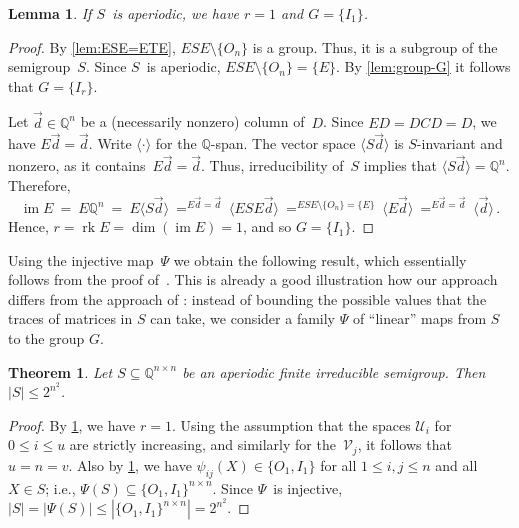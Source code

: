 \documentclass{lmcs}
\newtheorem{theorem}[thm]{Theorem}
\newtheorem{lemma}[thm]{Lemma}
\theoremstyle{definition}
\DeclareMathOperator{\im}{im}
\newcommand{\rk}{\operatorname{rk}}
\newcommand{\Q}{\mathbb{Q}}
\newcommand{\U}{\mathcal{U}}
\newcommand{\V}{\mathcal{V}}
\begin{document}
\begin{lemma} \label{lem:aper-rank}
If $S$~is aperiodic, we have $r=1$ and $G = \{I_1\}$.
\end{lemma}
\begin{proof}
By \cref{lem:ESE=ETE}, $E S E \setminus \{O_n\}$ is a group.
Thus, it is a subgroup of the semigroup~$S$.
Since $S$~is aperiodic, $E S E \setminus \{O_n\} = \{E\}$.
By \cref{lem:group-G} it follows that $G = \{I_r\}$.

Let $\vec{d} \in \Q^n$ be a (necessarily nonzero) column of~$D$.
Since $E D = D C D = D$, we have $E \vec{d} = \vec{d}$.
Write $\langle \cdot \rangle$ for the $\Q$-span.
The vector space $\langle S \vec{d} \rangle$ is $S$-invariant and nonzero, as it contains~$E \vec{d} = \vec{d}$.
Thus, irreducibility of~$S$ implies that $\langle S \vec{d} \rangle = \Q^n$.
Therefore,
\[
 \im E \ = \ E \Q^n \ = \ E \langle S \vec{d} \rangle \ \mathop{=}^{E \vec{d} = \vec{d}} \ \langle E S E \vec{d} \rangle
 \ \mathop{=}^{E S E \setminus \{O_n\} = \{E\}} \ \langle E \vec{d} \rangle \ \mathop{=}^{E \vec{d} = \vec{d}} \ \langle \vec{d} \rangle\,.
\]
Hence, $r = \rk E = \dim (\im E) = 1$, and so $G = \{I_1\}$.
\end{proof}

Using the injective map~$\Psi$ we obtain the following result, which essentially follows from the proof of~\cite[Theorem~5.8]{AlmeidaSteinberg09}. This is already a good illustration how our approach differs from the approach of \cite{Schutzenberger62,Berstel2011,AlmeidaSteinberg09}: instead of bounding the possible values that the traces of matrices in $S$ can take, we consider a family $\Psi$ of ``linear'' maps from $S$ to the group $G$.

\begin{theorem}\label{thm:aper-bound}
Let $S \subseteq \Q^{n \times n}$ be an aperiodic finite irreducible semigroup. Then $|S| \le 2^{n^2}$.
\end{theorem}
\begin{proof}
By \cref{lem:aper-rank}, we have $r=1$.
Using the assumption that the spaces $\U_{i}$ for $0 \le i \le u$ are strictly increasing, and similarly for the~$\V_{j}$, it follows that $u = n = v$.
Also by \cref{lem:aper-rank}, we have $\psi_{i j}(X) \in \{O_1,I_1\}$ for all $1 \le i,j \le n$ and all $X \in S$; i.e., $\Psi(S) \subseteq \{O_1,I_1\}^{n \times n}$.
Since $\Psi$~is injective, $|S| = |\Psi(S)| \le |\{O_1,I_1\}^{n \times n}| = 2^{n^2}$.
\end{proof}
\end{document}
